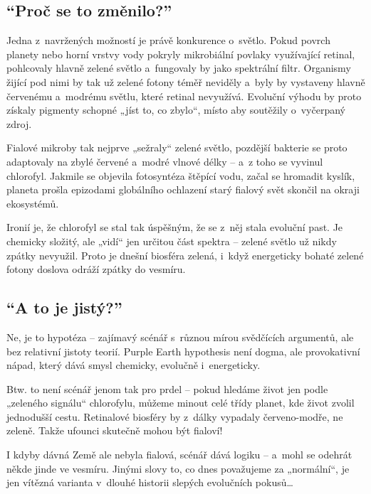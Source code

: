 \documentclass[main.tex]{subfiles}
\begin{document}
\subsection*{\enquote{Proč se to změnilo?}}
Jedna z~navržených možností je právě konkurence o~světlo. Pokud povrch planety nebo horní vrstvy vody pokryly mikrobiální povlaky využívající retinal, pohlcovaly hlavně zelené světlo a~fungovaly by jako spektrální filtr. Organismy žijící pod nimi by tak už zelené fotony téměř neviděly a~byly by vystaveny hlavně červenému a~modrému světlu, které retinal nevyužívá. Evoluční výhodu by proto získaly pigmenty schopné „jíst to, co zbylo“, místo aby soutěžily o~vyčerpaný zdroj.\par
Fialové mikroby tak nejprve „sežraly“ zelené světlo, pozdější bakterie se proto adaptovaly na zbylé červené a~modré vlnové délky – a~z toho se vyvinul chlorofyl. Jakmile se objevila fotosyntéza štěpící vodu, začal se hromadit kyslík, planeta prošla epizodami globálního ochlazení starý fialový svět skončil na okraji ekosystémů.\par
Ironií je, že chlorofyl se stal tak úspěšným, že se z~něj stala evoluční past. Je chemicky složitý, ale „vidí“ jen určitou část spektra – zelené světlo už nikdy zpátky nevyužil. Proto je dnešní biosféra zelená, i~když energeticky bohaté zelené fotony doslova odráží zpátky do vesmíru.
\subsection*{\enquote{A to je jistý?}}
Ne, je to  hypotéza – zajímavý scénář s~různou mírou svědčících argumentů, ale bez relativní jistoty teorií. Purple Earth hypothesis není dogma, ale provokativní nápad, který dává smysl chemicky, evolučně i~energeticky.\par
Btw. to není scénář jenom tak pro prdel – pokud hledáme život jen podle „zeleného signálu“ chlorofylu, můžeme minout celé třídy planet, kde život zvolil jednodušší cestu. Retinalové biosféry by z~dálky vypadaly červeno-modře, ne zeleně. Takže ufounci skutečně mohou být fialoví!\par
I kdyby dávná Země ale nebyla fialová, scénář dává logiku – a~mohl se odehrát někde jinde ve vesmíru. Jinými slovy to, co dnes považujeme za „normální“, je jen vítězná varianta v~dlouhé historii slepých evolučních pokusů…
\newpage
\end{document}
